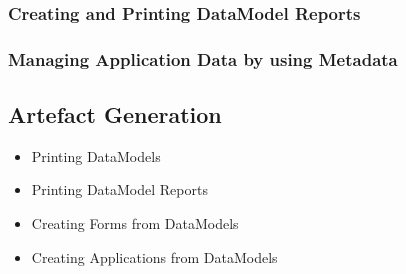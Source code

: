 \documentclass{article}
\begin{document}
\subsubsection{Creating and Printing DataModel Reports}
\subsubsection{Managing Application Data by using Metadata}



\subsection{Artefact Generation}

\begin{itemize}
	\item Printing DataModels
	\item Printing DataModel Reports
	\item Creating Forms from DataModels
	\item Creating Applications from DataModels	
\end{itemize}	
	
\subsubsection{}
\subsubsection{}
\subsubsection{}
	
\end{document}

